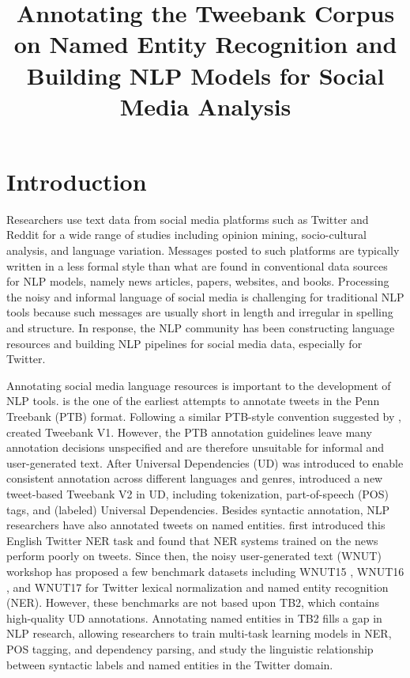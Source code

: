 \documentclass[10pt, a4paper]{article}
\title{Annotating the Tweebank Corpus on Named Entity Recognition and Building NLP Models for Social Media Analysis}
\begin{document}
\maketitleabstract

\section{Introduction}

Researchers use text data from social media platforms such as Twitter and Reddit for a wide range of studies including opinion mining, socio-cultural analysis, and language variation. Messages posted to such platforms are typically written in a less formal style than what are found in conventional data sources for NLP models, namely news articles, papers, websites, and books. Processing the noisy and informal language of social media is challenging for traditional NLP tools because such messages are usually short in length and irregular in spelling and structure. In response, the NLP community has been constructing language resources and building NLP pipelines for social media data, especially for Twitter. 




Annotating social media language resources is important to the development of NLP tools.  is the one of the earliest attempts to annotate tweets in the Penn Treebank (PTB) format. Following a similar PTB-style convention suggested by ,  created Tweebank V1. However, the PTB annotation guidelines leave many annotation decisions unspecified and are therefore unsuitable for informal and user-generated text. After Universal Dependencies (UD) \cite{nivre2016universal} was introduced to enable consistent annotation across different languages and genres,  introduced a new tweet-based Tweebank V2 in UD, including tokenization, part-of-speech (POS) tags, and (labeled) Universal Dependencies. Besides syntactic annotation, NLP researchers have also annotated tweets on named entities.  first introduced this English Twitter NER task and found that NER systems trained on the news perform poorly on tweets.  Since then, the noisy user-generated text (WNUT) workshop has proposed a few benchmark datasets including WNUT15 \cite{ws-2015-noisy}, WNUT16 \cite{ws-2015-noisy}, and WNUT17 \cite{ws-2017-noisy} for Twitter lexical normalization and named entity recognition (NER). However, these benchmarks are not based upon TB2, which contains high-quality UD annotations. 
Annotating named entities in TB2 fills a gap in NLP research, allowing researchers to train multi-task learning models in NER, POS tagging, and dependency parsing, and study the linguistic relationship between syntactic labels and named entities in the Twitter domain.
\end{document}
